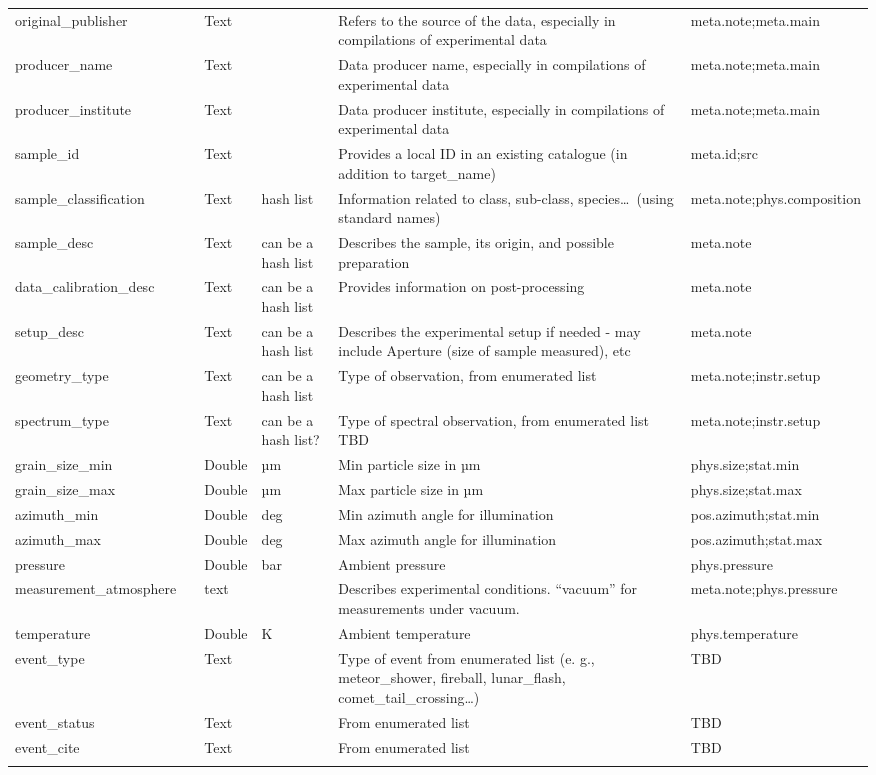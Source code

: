 \documentclass[11pt,a4paper]{ivoa}
\begin{document}
\begin{longtable}{p{3.5cm}p{0.5cm}p{1cm}p{1cm}p{7cm}p{3cm}}
original\_publisher&&Text&&Refers to the source of the data, especially in compilations of experimental data&meta.note;meta.main\\
producer\_name&&Text&&Data producer name, especially in compilations of experimental data&meta.note;meta.main\\
producer\_institute&&Text&&Data producer institute, especially in compilations of experimental data&meta.note;meta.main\\
sample\_id&&Text&&Provides a local ID in an existing catalogue (in addition to target\_name)&meta.id;src\\
sample\_classification&&Text&hash list&Information related to class, sub-class, species… (using standard names)&meta.note;phys.composition\\
sample\_desc&&Text&can be a hash list&Describes the sample, its origin, and possible preparation&meta.note\\
data\_calibration\_desc&&Text&can be a hash list&Provides information on post-processing &meta.note\\
setup\_desc&&Text&can be a hash list&Describes the experimental setup if needed - may include Aperture (size of sample measured), etc&meta.note\\
geometry\_type&&Text&can be a hash list&Type of observation, from enumerated list&meta.note;instr.setup\\
spectrum\_type&&Text&can be a hash list?&Type of spectral observation, from enumerated list TBD&meta.note;instr.setup\\
grain\_size\_min&&Double&µm&Min particle size in µm&phys.size;stat.min\\
grain\_size\_max&&Double&µm&Max particle size in µm&phys.size;stat.max\\
azimuth\_min&&Double&deg&Min azimuth angle for illumination&pos.azimuth;stat.min\\
azimuth\_max&&Double&deg&Max azimuth angle for illumination&pos.azimuth;stat.max\\
pressure&&Double&bar&Ambient pressure&phys.pressure\\
measurement\_atmosphere&&text&&Describes experimental conditions. ``vacuum'' for measurements under vacuum.&meta.note;phys.pressure\\
temperature&&Double&K&Ambient temperature&phys.temperature\\
event\_type&&Text&&Type of event from enumerated list (e. g., meteor\_shower, fireball, lunar\_flash, comet\_tail\_crossing…)&TBD\\
event\_status&&Text&&From enumerated list&TBD\\
event\_cite&&Text&&From enumerated list&TBD\\
\sptablerule
\end{longtable}
\endgroup
\end{document}
